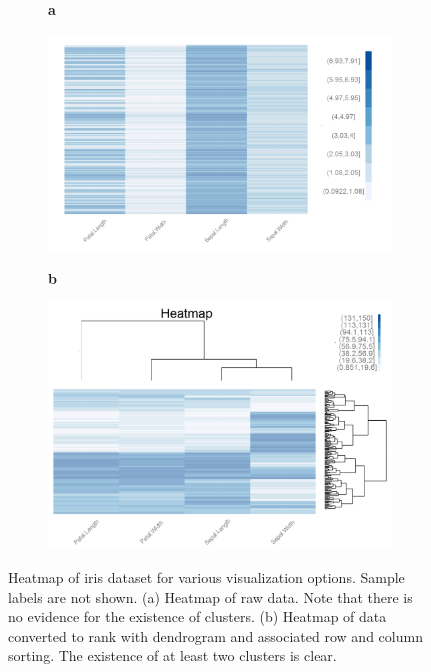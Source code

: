 \documentclass[12pt]{article}
\begin{document}
\begin{figure}[t!]
	\centering
	\begin{subfigure}[t]{0.01\textwidth}
		\textbf{a}
	\end{subfigure}
	\begin{subfigure}[t]{0.48\textwidth}
		\includegraphics[width=\textwidth,valign=t]{Figures/Iris/HeatmapRawnodendro.png}
		\subcaption{}
		\label{fig:FigHeatmapRawnodendro}
	\end{subfigure}\hfill
	\begin{subfigure}[t]{0.01\textwidth}
		\textbf{b}
	\end{subfigure}
	\begin{subfigure}[t]{0.48\textwidth}
		\includegraphics[width=\textwidth,valign=t]{Figures/Iris/HeatmapRanksDendro.png}
		\subcaption{}
		\label{fig:FigHeatmapRanksdendro}
	\end{subfigure}
	\vspace{-1.5\baselineskip}
	\caption{Heatmap of iris dataset for various visualization options. Sample labels are not shown. (a) Heatmap of raw data. Note that there is no evidence for the existence of clusters. (b) Heatmap of data converted to rank with dendrogram and associated row and column sorting. The existence of at least two clusters is clear.}
	\label{fig:FigHeatmap}
\end{figure}
\end{document}
